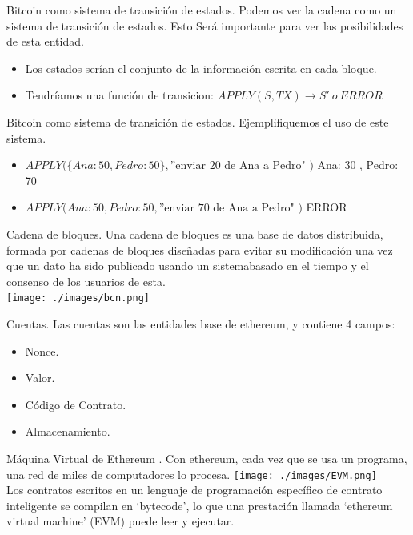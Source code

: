 \documentclass[usenames,dvipsnames]{beamer}
\begin{document}
\begin{frame}{ Bitcoin como sistema de transición de estados. }
Podemos ver la cadena como un sistema de transición de estados. Esto Será importante para ver las posibilidades de esta entidad.
\begin{itemize}
	\item Los estados serían el conjunto de la información escrita en cada bloque.
  	\item Tendríamos una  función de transicion: $ APPLY( S , TX ) \to S'\ o\ ERROR$
\end{itemize}
\end{frame}


\begin{frame}{ Bitcoin como sistema de transición de estados. }
Ejemplifiquemos el uso de este sistema.
\begin{itemize}
	\item $ APPLY( \{ Ana: 50 , Pedro: 50 \} , \text{''enviar 20 de Ana a Pedro" )} $
  { Ana: 30 , Pedro: 70 }
  \item  $  APPLY( { Ana: 50 , Pedro: 50 } , \text{''enviar 70 de Ana a Pedro" )} $
  ERROR
\end{itemize}
\end{frame}


\begin{frame} {Cadena de bloques.}
Una cadena de bloques es una base de datos distribuida, formada por cadenas de bloques
diseñadas para evitar su modificación una vez que un dato ha sido publicado usando un sistemabasado en el tiempo y el consenso de los usuarios de esta.\\
\vspace{0.3cm}
\texttt{[image: ./images/bcn.png]}
\end{frame}

\begin{frame}{ Cuentas. }
	Las cuentas son las entidades base de ethereum, y contiene 4 campos:
	\begin{itemize}
	\item Nonce.
	\item Valor.
	\item Código de Contrato.
	\item Almacenamiento.
	\end{itemize}
\end{frame}


\begin{frame}{ Máquina Virtual de Ethereum . }
Con ethereum, cada vez que se usa un programa, una red de miles de computadores lo procesa. 
\texttt{[image: ./images/EVM.png]}\\Los contratos escritos en un lenguaje de programación específico de contrato inteligente se compilan en ‘bytecode’, lo que una prestación llamada ‘ethereum virtual machine’ (EVM) puede leer y ejecutar.
\end{frame}
\end{document}
